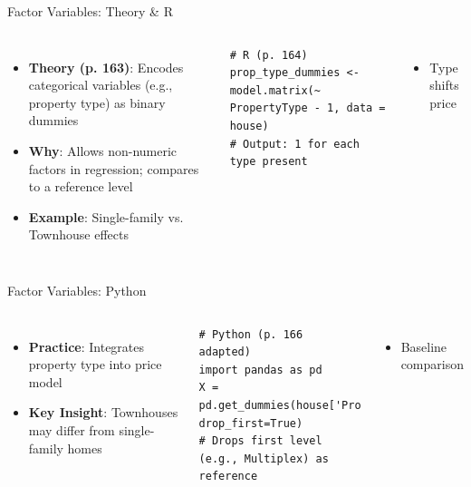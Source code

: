 \documentclass{beamer}
\begin{document}
	\begin{frame}[fragile]{Factor Variables: Theory \& R}
		\begin{columns}
			\begin{itemize}
				\item \textbf{Theory (p. 163)}: Encodes categorical variables (e.g., property type) as binary dummies
				\item \textbf{Why}: Allows non-numeric factors in regression; compares to a reference level
				\item \textbf{Example}: Single-family vs. Townhouse effects
			\end{itemize}
			\begin{lstlisting}
# R (p. 164)
prop_type_dummies <- model.matrix(~ PropertyType - 1, data = house)
# Output: 1 for each type present
			\end{lstlisting}
			\begin{itemize}
				\item Type shifts price
			\end{itemize}
		\end{columns}
	\end{frame}
	
	\begin{frame}[fragile]{Factor Variables: Python}
		\lstset{language=Python}
		\begin{columns}
			\column{0.6\textwidth}
			\begin{itemize}
				\item \textbf{Practice}: Integrates property type into price model
				\item \textbf{Key Insight}: Townhouses may differ from single-family homes
			\end{itemize}
			\begin{lstlisting}
# Python (p. 166 adapted)
import pandas as pd
X = pd.get_dummies(house['PropertyType'], drop_first=True)
# Drops first level (e.g., Multiplex) as reference
			\end{lstlisting}
			\column{0.4\textwidth}
			\begin{itemize}
				\item Baseline comparison
			\end{itemize}
		\end{columns}
	\end{frame}
	
\end{document}
